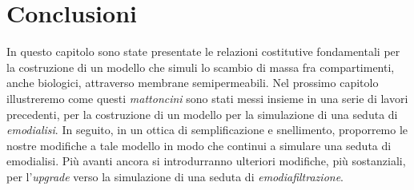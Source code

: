 \section{Conclusioni}
In questo capitolo sono state presentate le relazioni costitutive fondamentali per la costruzione di un modello che simuli lo scambio di massa fra compartimenti, anche biologici, attraverso membrane semipermeabili. Nel prossimo capitolo illustreremo come questi \textit{mattoncini} sono stati messi insieme in una serie di lavori precedenti\cite{casagrande,gatti,SilvTer,merulla}, per la costruzione di un modello per la simulazione di una seduta di \textit{emodialisi}. In seguito, in un ottica di semplificazione e snellimento, proporremo le nostre modifiche a tale modello in modo che continui a simulare una seduta di emodialisi. Più avanti ancora si introdurranno ulteriori modifiche, più sostanziali, per l'\textit{upgrade} verso la simulazione di una seduta di \textit{emodiafiltrazione}.